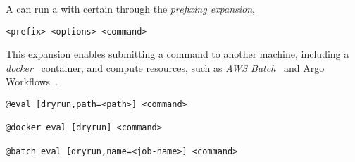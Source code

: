 A  can run a  with certain  through the \emph{prefixing expansion},
%
\begin{graybox}
\begin{verbatim}
<prefix> <options> <command>
\end{verbatim}
\end{graybox}
%
This expansion enables submitting a command to another machine, including a \emph{docker}~\cite{docker} container, and compute resources, such as \emph{AWS Batch}~\cite{aws_batch} and Argo Workflows~\cite{argoflow}.
%
\begin{graybox}
\begin{verbatim}
@eval [dryrun,path=<path>] <command>

@docker eval [dryrun] <command>

@batch eval [dryrun,name=<job-name>] <command>
\end{verbatim}
\end{graybox}
